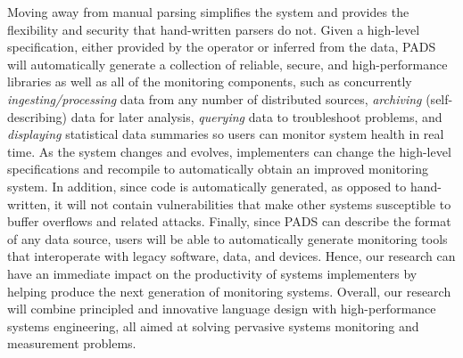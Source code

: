 Moving away from manual parsing simplifies the system and provides the
flexibility and security that hand-written parsers do not.  Given a
high-level specification, either provided by the operator or inferred
from the data, PADS will automatically generate a collection of
reliable, secure, and high-performance libraries as well as all of the
monitoring components, such as concurrently {\em ingesting/processing}
data from any number of distributed sources, {\em archiving}
(self-describing) data for later analysis, {\em querying} data to
troubleshoot problems, and {\em displaying} statistical data summaries
so users can monitor system health in real time.  As the system
changes and evolves, implementers can change the high-level
specifications and recompile to automatically obtain an improved
monitoring system.  In addition, since code is automatically
generated, as opposed to hand-written, it will not contain
vulnerabilities that make other systems susceptible to buffer
overflows and related attacks.  Finally, since PADS can describe the
format of any data source, users will be able to automatically
generate monitoring tools that interoperate with legacy software,
data, and devices.  Hence, our research can have an
immediate impact on the productivity of systems implementers by
helping produce the next generation of monitoring systems.  Overall,
our research will combine principled and innovative language design
with high-performance systems engineering, all aimed at solving
pervasive systems monitoring and measurement problems.

